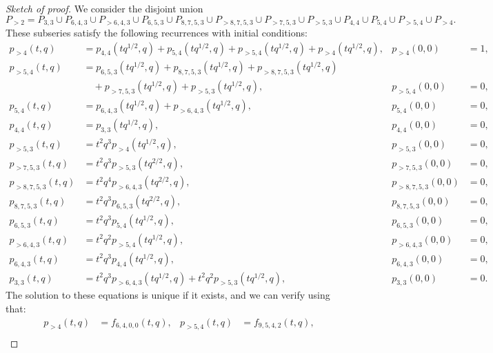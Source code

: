 \documentclass[a4paper, 12pt, reqno]{amsart}
\theoremstyle{remark}
\begin{document}
\begin{proof}[Sketch of proof]
  We consider the disjoint union
  \begin{equation*}
    P_{>2} = P_{3, 3} \cup P_{6, 4, 3} \cup P_{>6, 4, 3} \cup P_{6, 5, 3} \cup P_{8, 7, 5, 3} \cup P_{>8, 7, 5, 3} \cup P_{>7, 5, 3} \cup P_{>5, 3} \cup P_{4, 4} \cup P_{5, 4} \cup P_{>5, 4} \cup P_{>4}.
  \end{equation*}
  These subseries satisfy the following recurrences with initial conditions:
  \begin{align*}
    p_{>4}(t, q) &= p_{4, 4}(tq^{1/2}, q) + p_{5, 4}(tq^{1/2}, q) + p_{>5, 4}(tq^{1/2}, q) + p_{>4}(tq^{1/2}, q), &p_{>4}(0, 0) &= 1, \\
    p_{>5, 4}(t, q) &= p_{6, 5, 3}(tq^{1/2}, q) + p_{8, 7, 5, 3}(tq^{1/2}, q) + p_{>8, 7, 5, 3}(tq^{1/2}, q) \\
                 &\quad + p_{>7, 5, 3}(tq^{1/2}, q) + p_{>5, 3}(tq^{1/2}, q), &p_{>5, 4}(0, 0) &= 0, \\
    p_{5, 4}(t, q) &= p_{6, 4, 3}(tq^{1/2}, q) + p_{>6, 4, 3}(tq^{1/2}, q), &p_{5, 4}(0, 0) &= 0, \\
    p_{4, 4}(t, q) &= p_{3, 3}(tq^{1/2}, q), &p_{4, 4}(0, 0) &= 0, \\
    p_{>5, 3}(t, q) &= t^2q^3p_{>4}(tq^{1/2}, q), &p_{>5, 3}(0, 0) &= 0, \\
    p_{>7, 5, 3}(t, q) &= t^2q^3p_{>5, 3}(tq^{2/2}, q), &p_{>7, 5, 3}(0, 0) &= 0, \\
    p_{>8, 7, 5, 3}(t, q) &= t^2q^4p_{>6, 4, 3}(tq^{2/2}, q), &p_{>8, 7, 5, 3}(0, 0) &= 0, \\
    p_{8, 7, 5, 3}(t, q) &= t^2q^3p_{6, 5, 3}(tq^{2/2}, q), &p_{8, 7, 5, 3}(0, 0) &= 0, \\
    p_{6, 5, 3}(t, q) &= t^2q^3p_{5, 4}(tq^{1/2}, q), &p_{6, 5, 3}(0, 0) &= 0, \\
    p_{>6, 4, 3}(t, q) &= t^2q^2p_{>5, 4}(tq^{1/2}, q), &p_{>6, 4, 3}(0, 0) &= 0, \\
    p_{6, 4, 3}(t, q) &= t^2q^3p_{4, 4}(tq^{1/2}, q), &p_{6, 4, 3}(0, 0) &= 0, \\
    p_{3, 3}(t, q) &= t^2q^3p_{>6, 4, 3}(tq^{1/2}, q) + t^2q^2p_{>5, 3}(tq^{1/2}, q), &p_{3, 3}(0, 0) &= 0.
  \end{align*}
  The solution to these equations is unique if it exists, and we can verify using  that:
  \begin{align*}
    p_{>4}(t, q) &= f_{6, 4, 0, 0}(t, q), &p_{>5, 4}(t, q) &= f_{9, 5, 4, 2}(t, q), \\

\end{align*}
\end{proof}
\end{document}
